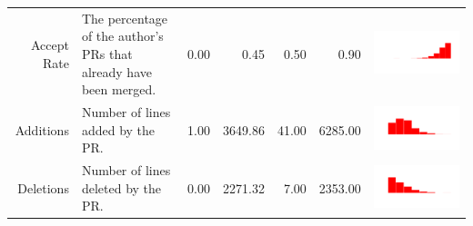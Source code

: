 \documentclass[conference]{IEEEtran}
\begin{document}
\begin{table}[ht]
\begin{tabular}{rp{26em}rrrrc}
    Accept Rate & The percentage of the author's PRs that already have been merged. & 0.00 & 0.45 & 0.50 & 0.90 & \includegraphics[scale = 0.1, clip = true, trim= 50px 60px 50px 60px]{../figs/hist-features/hist-pullRequestRatio.pdf} \\
    Additions & Number of lines added by the PR. & 1.00 & 3649.86 & 41.00 & 6285.00 & \includegraphics[scale = 0.1, clip = true, trim= 50px 60px 50px 60px]{../figs/hist-features/hist-additions.pdf} \\
    Deletions & Number of lines deleted by the PR. & 0.00 & 2271.32 & 7.00 & 2353.00 & \includegraphics[scale = 0.1, clip = true, trim= 50px 60px 50px 60px]{../figs/hist-features/hist-deletions.pdf} \\

\end{tabular}
\end{table}
\end{document}
